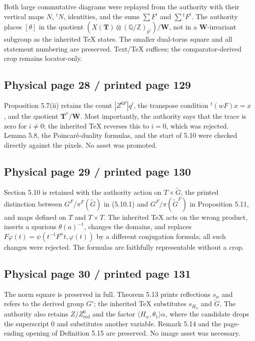 \documentclass[10pt]{article}
\begin{document}
Both large commutative diagrams were replayed from the authority with their vertical maps \(N\), \({}^tN\), identities, and the sums \(\sum F^i\) and \(\sum{}^tF^i\). The authority places \([\theta]\) in the quotient \((X(\mathbf T)\otimes(\mathbb Q/\mathbb Z)_{p'})/\mathbf W\), not in a \(\mathbf W\)-invariant subgroup as the inherited TeX states. The smaller dual-torus square and all statement numbering are preserved. Text/TeX suffices; the comparator-derived crop remains locator-only.\par

\subsection*{Physical page 28 / printed page 129}

Proposition 5.7(ii) retains the count \(|Z^{0F}|q^l\), the transpose condition \({}^t(wF)x=x\), and the quotient \(\mathbf T^*/\mathbf W\). Most importantly, the authority says that the trace is zero for \(i\ne0\); the inherited TeX reverses this to \(i=0\), which was rejected. Lemma 5.8, the Poincaré-duality formulas, and the start of 5.10 were checked directly against the pixels. No asset was promoted.\par

\subsection*{Physical page 29 / printed page 130}

Section 5.10 is retained with the authority action on \(T\times\widetilde G\), the printed distinction between \(G^F/\pi^F(\widetilde G)\) in (5.10.1) and \(G^F/\pi(\widetilde G^F)\) in Proposition 5.11, and maps defined on \(T\) and \(T\times T\). The inherited TeX acts on the wrong product, inserts a spurious \(\theta(a)^{-1}\), changes the domains, and replaces \(F\varphi(t)=\psi(t^{-1}F^nt,\varphi(t))\) by a different conjugation formula; all such changes were rejected. The formulas are faithfully representable without a crop.\par

\subsection*{Physical page 30 / printed page 131}

The norm square is preserved in full. Theorem 5.13 prints reflections \(s_\alpha\) and refers to the derived group \(G'\); the inherited TeX substitutes \(s_{H_\alpha}\) and \(\widetilde G\). The authority also retains \(Z/Z_{\mathrm{red}}^0\) and the factor \(\langle H_\alpha,\theta_1\rangle\alpha\), where the candidate drops the superscript \(0\) and substitutes another variable. Remark 5.14 and the page-ending opening of Definition 5.15 are preserved. No image asset was necessary.\par
\end{document}
